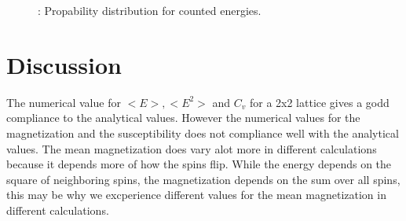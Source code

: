 \documentclass{article}
\begin{document}
{{\begin{figure}
\caption{: Propability distribution for counted energies.}
\label{fig:propability}
\end{figure}


\section{Discussion}


The numerical value for $<E>, <E^2>$ and $C_v$ for a 2x2 lattice gives a godd compliance to the analytical values. However the numerical values for the magnetization and the susceptibility does not compliance well with the analytical values. The mean magnetization does vary alot more in different calculations because it depends more of how the spins flip. While the energy depends on the square of neighboring spins, the magnetization depends on the sum over all spins, this may be why we excperience different values for the mean magnetization in different calculations.

}}
\end{document}
